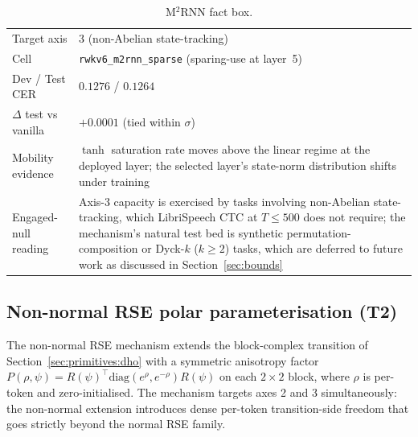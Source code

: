\begin{table}[h]
\centering
\small
\caption[M$^{2}$RNN engaged-null entry]{M$^{2}$RNN fact box.}
\label{tab:engaged-null:m2rnn}
\setlength{\tabcolsep}{6pt}
\renewcommand{\arraystretch}{1.05}
\begin{tabularx}{\linewidth}{@{}p{3.3cm} X@{}}
\toprule
Target axis & 3 (non-Abelian state-tracking) \\
Cell & \texttt{rwkv6\_m2rnn\_sparse} (sparing-use at layer~5) \\
Dev / Test CER & $0.1276$ / $0.1264$ \\
$\Delta$ test vs vanilla & $+0.0001$ (tied within $\sigma$) \\
Mobility evidence & $\tanh$ saturation rate moves above the linear
regime at the deployed layer; the selected layer's state-norm
distribution shifts under training \\
Engaged-null reading & Axis-3 capacity is exercised by tasks
involving non-Abelian state-tracking, which LibriSpeech CTC at $T
\le 500$ does not require; the mechanism's natural test bed is
synthetic permutation-composition or Dyck-$k$ ($k \ge 2$) tasks,
which are deferred to future work as discussed in
Section~\ref{sec:bounds} \\
\bottomrule
\end{tabularx}
\end{table}

\subsection{Non-normal RSE polar parameterisation
(T2)}\label{app:engaged-null:t2}

The non-normal RSE mechanism extends the block-complex transition of
Section~\ref{sec:primitives:dho} with a symmetric anisotropy factor
$P(\rho, \psi) = R(\psi)^{\top} \mathrm{diag}(e^{\rho}, e^{-\rho})
R(\psi)$ on each $2 \times 2$ block, where $\rho$ is per-token and
zero-initialised. The mechanism targets axes 2 and 3 simultaneously:
the non-normal extension introduces dense per-token transition-side
freedom that goes strictly beyond the normal RSE family.

